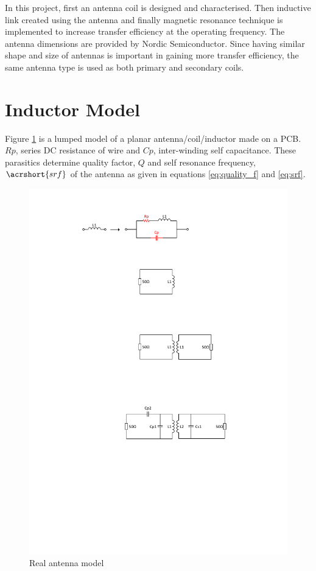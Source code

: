 \documentclass[12pt,a4paper,UKenglish]{report}
\begin{document}
In this project, first an antenna coil is designed and characterised. Then inductive link created using the antenna
and finally magnetic resonance technique is implemented to increase transfer efficiency at the operating frequency. The antenna 
dimensions are provided by Nordic Semiconductor. Since having 
similar shape and size of antennas is important in gaining more transfer efficiency, the same antenna type is used as both 
primary and secondary coils. \\

\section{Inductor Model}		%

Figure \ref{fig:ant_non_ideal} is a lumped model of a planar antenna/coil/inductor made on a PCB. $Rp$, series DC resistance of wire and $Cp$, 
inter-winding self capacitance. These parasitics determine quality factor, $Q$ and self resonance frequency, $\acrshort{srf}$ of 
the antenna as given in equations  \ref{eq:quality_f} and  \ref{eq:srf}.  \\

\begin{figure}[!htbp] %
   \centering
   \includegraphics[width=1\textwidth]{img/ant_non_ideal.pdf} 
   \caption{Real antenna model}
   \label{fig:ant_non_ideal}
\end{figure}
\end{document}

